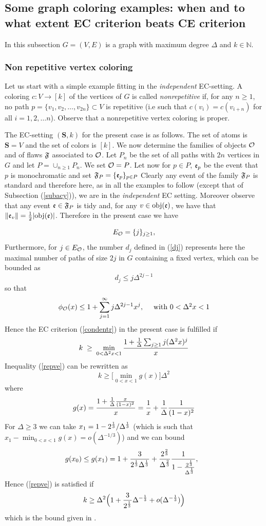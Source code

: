\documentclass[11pt]{article}
\let\D=\Delta \let\F=\Phi \let\G=\Gamma \let\L=\Lambda \let\Th=\Theta
\def\ee{\end{equation}}
\def\be{\begin{equation}}
\begin{document}
\subsection{Some graph coloring examples: when and to what extent EC criterion beats CE criterion}
In this subsection $G=(V,E)$ is  a graph with maximum degree $\D$  and  $k\in \mathbb{N}$.
\subsubsection{Non repetitive vertex coloring}

Let us start with a simple example fitting in the {\it independent} EC-setting.
A coloring $c: V\to [k]$ of the vertices of $G$ is called {\it nonrepetitive} if, for any $n \ge 1$, no path $p=\{v_1,v_2,\dots, v_{2n}\}\subset V$
is repetitive (i.e such that $c(v_i)=c(v_{i+n})$ for all $i=1,2,\dots n$). Observe that a nonrepetitive vertex
coloring is proper.

\noindent
The  EC-setting $(\mathbf{S},k)$ for the present case is as follows. The set of atoms is $\mathbf{S}=V$  and  the set of colors is $[k]$.
We now determine
the families of objects ${{\mathcal O}}$ and of  flaws ${\mathfrak{F}}$ associated to ${{\mathcal O}}$.
Let $P_{n}$ be the set of all paths with $2n$ vertices in $G$ and let $P=\cup_{n \geq 1}{P_n}$.
We set  ${{\mathcal O}}= P$. Let now for $p\in P$, ${\mathfrak{e}}_p$ be the event  that $p$ is monochromatic and set
$
{\mathfrak{F}}_P=\{{\mathfrak{e}}_p\}_{p \in P}
$
Clearly any event of the family ${\mathfrak{F}}_P$ is standard and therefore here, as in all the examples to follow (except that
of Subsection (\ref{subacy})), we are in the {\it independent} EC setting. Moreover
observe that any event ${\mathfrak{e}}\in {\mathfrak{F}}_P$ is  tidy and, for any $v\in {\rm obj}({\mathfrak{e}})$,  we have that $\|{\mathfrak{e}}_v\|={1\over 2}|{\rm obj}({\mathfrak{e}})|$.
Therefore in the present case  we have


\noindent
$$
E_{{\mathcal O}}= \{j\}_{j\ge 1},
$$
Furthermore, for $j\in  E_{{\mathcal O}}$, the number $d_j$ defined in (\ref{dj}) represents here
the maximal number of paths of size $2j$ in $G$ containing a fixed vertex, which can be bounded as
\be\label{djei}
d_{j} \leq j\D^{2j-1}
\ee
so that
$$
\phi_\A(x)\le 1+ \sum_{j=1}^\infty j\D^{2j-1}x^j,  ~~~~ \mbox{with $0<\D^2x<1$}
$$
Hence the EC criterion  (\ref{condentr}) in the present case is fulfilled if
\be\label{repve}
k\;\ge \;\min_{0<\D^{2}x<1}{1+{1\over \D}\sum_{j\ge 1}j(\D^{2}x)^j\over x}
\ee
Inequality (\ref{repve}) can be rewritten as
$$
{k}\ge \Big[\min_{0<x<1}g(x)\Big]\D^2
$$
where
$$
g(x)={1+ {1\over \D}{x\over (1-x)^2}\over x} = {1\over x}+{1\over \D}{1\over (1-x)^2}
$$
 For $\D\ge 3$
we can take $x_1= 1-2^{1\over 3}/\D^{1\over 3}$ (which  is such that   $x_1-\min_{0<x<1}g(x)= o(\D^{-1/3})$)
and  we can bound
$$
g(x_0)\le g(x_1)=
 1+ {3\over 2^{1\over 3} \D^{1\over 3}}+ {2^{2\over 3}\over \D^{2\over 3}}{1\over 1- {2^{1\over 3}\over \D^{1\over 3}}}, ~~
 $$
Hence  (\ref{repve}) is satisfied if
\be\label{acyc}
k\ge \D^2\Big( 1+ {3\over 2^{1\over 3} }\D^{-{1\over 3}}+ o({\D^{-{1\over 3}}}) \Big)
\ee
which is
the  bound   given  in \cite{GMP}.
\end{document}

